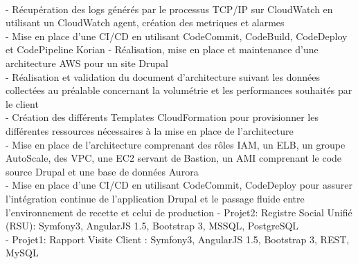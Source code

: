 \documentclass[letterpaper]{twentysecondcv} %
\begin{document}
\begin{twenty}
{\\- Récupération des logs générés par le processus TCP/IP sur CloudWatch en utilisant un CloudWatch agent, création des metriques et alarmes
\\- Mise en place d’une CI/CD en utilisant CodeCommit, CodeBuild, CodeDeploy et CodePipeline
%
\newline\newline Korian - Réalisation, mise en place et maintenance d’une architecture AWS pour un site Drupal 
\\- Réalisation et validation du document d’architecture suivant les données collectées au préalable concernant la volumétrie et les performances souhaités par le client
\\- Création des différents Templates CloudFormation pour provisionner les différentes ressources nécessaires à la mise en place de l’architecture
\\- Mise en place de l’architecture comprenant des rôles IAM, un ELB, un groupe AutoScale, des VPC, une EC2 servant de Bastion, un AMI comprenant le code source Drupal et une base de données Aurora
\\- Mise en place d’une CI/CD en utilisant CodeCommit, CodeDeploy pour assurer l’intégration continue de l’application Drupal et le passage fluide entre l’environnement de recette et celui de production
}
	{- Projet2: Registre Social Unifié (RSU): Symfony3, AngularJS 1.5, Bootstrap 3, MSSQL, PostgreSQL
	\\- Projet1: Rapport Visite Client : Symfony3, AngularJS 1.5, Bootstrap 3, REST, MySQL }
\end{twenty}
%
%
%

\end{document}
